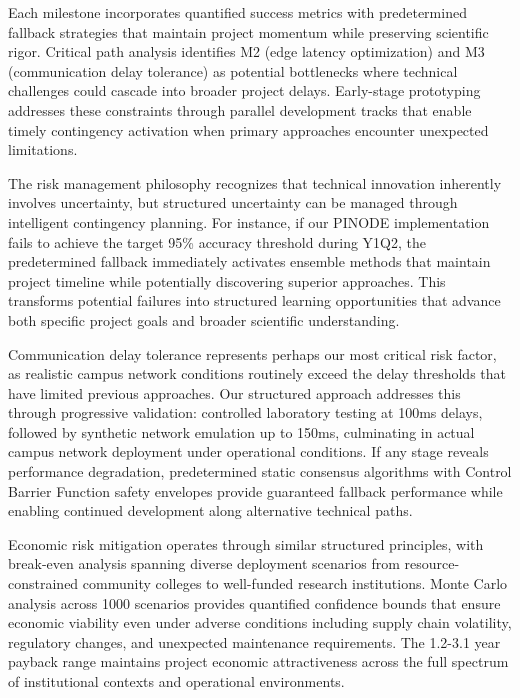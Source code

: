 \documentclass[12pt]{article}
\begin{document}
Each milestone incorporates quantified success metrics with predetermined fallback strategies that maintain project momentum while preserving scientific rigor. Critical path analysis identifies M2 (edge latency optimization) and M3 (communication delay tolerance) as potential bottlenecks where technical challenges could cascade into broader project delays. Early-stage prototyping addresses these constraints through parallel development tracks that enable timely contingency activation when primary approaches encounter unexpected limitations.

The risk management philosophy recognizes that technical innovation inherently involves uncertainty, but structured uncertainty can be managed through intelligent contingency planning. For instance, if our PINODE implementation fails to achieve the target 95\% accuracy threshold during Y1Q2, the predetermined fallback immediately activates ensemble methods that maintain project timeline while potentially discovering superior approaches. This transforms potential failures into structured learning opportunities that advance both specific project goals and broader scientific understanding.

Communication delay tolerance represents perhaps our most critical risk factor, as realistic campus network conditions routinely exceed the delay thresholds that have limited previous approaches. Our structured approach addresses this through progressive validation: controlled laboratory testing at 100ms delays, followed by synthetic network emulation up to 150ms, culminating in actual campus network deployment under operational conditions. If any stage reveals performance degradation, predetermined static consensus algorithms with Control Barrier Function safety envelopes provide guaranteed fallback performance while enabling continued development along alternative technical paths.

Economic risk mitigation operates through similar structured principles, with break-even analysis spanning diverse deployment scenarios from resource-constrained community colleges to well-funded research institutions. Monte Carlo analysis across 1000 scenarios provides quantified confidence bounds that ensure economic viability even under adverse conditions including supply chain volatility, regulatory changes, and unexpected maintenance requirements. The 1.2-3.1 year payback range maintains project economic attractiveness across the full spectrum of institutional contexts and operational environments.
\end{document}
